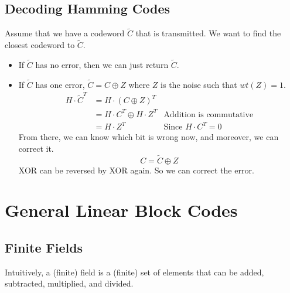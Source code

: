 \documentclass[letterpaper,12pt]{article}
\begin{document}
\subsection{Decoding Hamming Codes}
Assume that we have a codeword $\tilde{C}$ that is transmitted. We want to find
the closest codeword to $\tilde{C}$.\begin{itemize}
    \item If $\tilde{C}$ has no error, then we can just return $\tilde{C}$.
    \item If $\tilde{C}$ has one error, $\tilde{C}=C\oplus Z$ where $Z$ is the noise such
          that $wt(Z)=1$. \begin{align*}
              H\cdot \tilde{C}^T & = H\cdot (C\oplus Z)^T                                         \\
                                 & = H\cdot C^T\oplus H\cdot Z^T & \text{Addition is commutative} \\
                                 & = H\cdot Z^T                  & \text{Since $H\cdot C^T=0$}
          \end{align*}
          From there, we can know which bit is wrong now, and moreover, we can correct it.\[
              C = \tilde{C}\oplus Z
          \] XOR can be reversed by XOR again. So we can correct the error.
\end{itemize}
\section{General Linear Block Codes}
\subsection{Finite Fields}
Intuitively, a (finite) field is a (finite) set of elements that can be added,
subtracted, multiplied, and divided.
\end{document}
